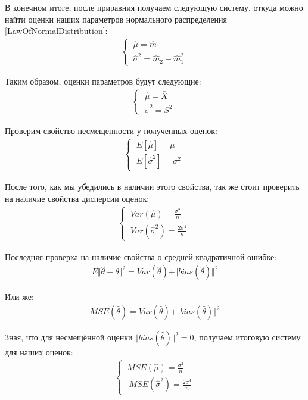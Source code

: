 \documentclass[12pt]{article}
\begin{document}
В конечном итоге, после приравния получаем следующую систему, откуда можно найти оценки наших параметров нормального распределения \eqref{LawOfNormalDistribution}:
\begin{gather*}
    \begin{cases}
    \ \hat{\mu} = \hat{m}_1 \\
    \ \hat{\sigma}^2 = \hat{m}_2 - \hat{m}_1^2\
    \end{cases}
    \label{FinalSystemOfEquations}
\end{gather*}
\newpage

Таким образом, оценки параметров будут следующие:
\begin{gather*}
    \begin{cases}
    \ \hat{\mu} = \bar{X} \\
    \ \hat{\sigma}^2 = S^2\
    \end{cases}
    \label{FinalSystemOfEquations}
\end{gather*}

Проверим свойство несмещенности у полученных оценок:
\begin{gather*}
    \begin{cases}
    \  E[\hat{\mu}] = \mu \\
    \ E[\hat{\sigma}^2] = \sigma^2\
    \end{cases}
\end{gather*}

После того, как мы убедились в наличии этого свойства, так же стоит проверить на наличие свойства дисперсии оценок:
\begin{gather*}
    \begin{cases}
    \ Var(\hat{\mu}) = \frac{\sigma^2}{n} \\
    \ Var(\hat{\sigma}^2) = \frac{2\sigma^4}{n}\
    \end{cases}
\end{gather*}

Последняя проверка на наличие свойства о средней квадратичной ошибке:
\begin{gather}
    \label{RootMeanSquareError1}
    \ E\Vert\hat{\theta} - \theta\Vert^2 = Var({\hat{\theta}}) + \Vert bias(\hat{\theta})\Vert^2\
\end{gather}

Или же:
\begin{gather}
    \label{RootMeanSquareError2}
    \ MSE(\hat{\theta}) = Var({\hat{\theta}}) + \Vert bias(\hat{\theta})\Vert^2\
\end{gather}

Зная, что для несмещённой оценки $\Vert bias(\hat{\theta})\Vert^2 = 0$, получаем итоговую систему для наших оценок:
\begin{gather*}
    \begin{cases}
        \ MSE(\hat{\mu}) = \frac{\sigma^2}{n} \\ \
        \ MSE(\hat{\sigma}^2) = \frac{2\sigma^4}{n}
    \end{cases}
\end{gather*}
\newpage
\end{document}
